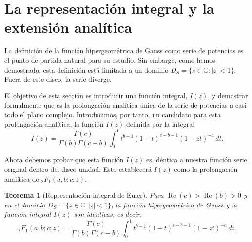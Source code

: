 \documentclass[12pt,a4paper]{book}
\renewcommand{\Re}{\operatorname{Re}}
\newtheorem{theorem}{Teorema}
\begin{document}
\section{La representación integral y la extensión analítica}
\label{sec:representacion_integral}

La definición de la función hipergeométrica de Gauss como serie de potencias es el punto de partida natural para su estudio. Sin embargo, como hemos demostrado, esta definición está limitada a un dominio $D_S = \{z \in \mathbb{C} : |z| < 1\}$. Fuera de este disco, la serie diverge.

El objetivo de esta sección es introducir una función integral, $I(z)$, y demostrar formalmente que es la prolongación analítica única de la serie de potencias a casi todo el plano complejo. 
Introducimos, por tanto, un candidato para esta prolongación analítica, la función $I(z)$ definida por la integral
\[
I(z)= \frac{\Gamma(c)}{\Gamma(b)\Gamma(c-b)} \int_0^1 t^{b-1} (1-t)^{c-b-1} (1-zt)^{-a} \,dt.
\]

Ahora debemos probar que esta función $I(z)$ es idéntica a nuestra función serie original dentro del disco unidad. Esto establecerá $I(z)$ como la prolongación analítica de ${}_{2}F_{1}(a,b;c;z)$.

\begin{theorem}[Representación integral de Euler]
\label{teo:representacion_integral_euler}
Para $\Re(c) > \Re(b) > 0$ y en el dominio $D_S = \{z \in \mathbb{C} : |z| < 1\}$, la función hipergeométrica de Gauss y la función integral $I(z)$ son idénticas, es decir,
\begin{equation}
\label{eq:integral_euler}
    {}_{2}F_{1}(a,b;c;z) = \frac{\Gamma(c)}{\Gamma(b)\Gamma(c-b)} \int_0^1 t^{b-1} (1-t)^{c-b-1} (1-zt)^{-a} \,dt.
\end{equation}
\end{theorem}
\end{document}

